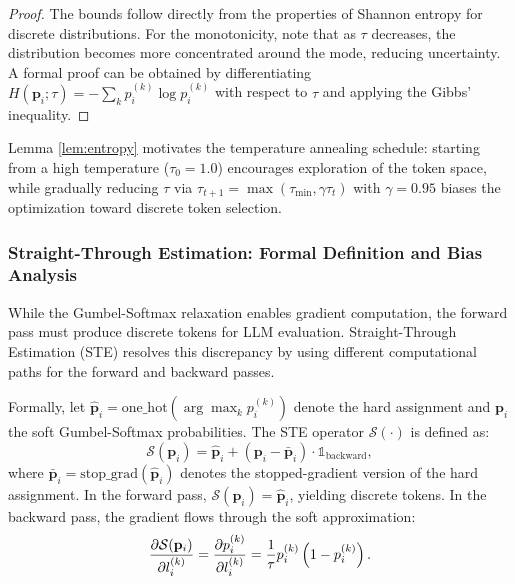 ﻿\documentclass[lettersize,journal]{IEEEtran}
\begin{document}
\begin{proof}
The bounds follow directly from the properties of Shannon entropy for discrete distributions. For the monotonicity, note that as $\tau$ decreases, the distribution becomes more concentrated around the mode, reducing uncertainty. A formal proof can be obtained by differentiating $H(\mathbf{p}_i; \tau) = -\sum_k p_i^{(k)} \log p_i^{(k)}$ with respect to $\tau$ and applying the Gibbs' inequality.
\end{proof}

Lemma \ref{lem:entropy} motivates the temperature annealing schedule: starting from a high temperature ($\tau_0 = 1.0$) encourages exploration of the token space, while gradually reducing $\tau$ via $\tau_{t+1} = \max(\tau_{\min}, \gamma \tau_t)$ with $\gamma = 0.95$ biases the optimization toward discrete token selection.

\subsubsection{Straight-Through Estimation: Formal Definition and Bias Analysis}
\label{sec:ste}

While the Gumbel-Softmax relaxation enables gradient computation, the forward pass must produce discrete tokens for LLM evaluation. Straight-Through Estimation (STE) \cite{bengio2013estimating} resolves this discrepancy by using different computational paths for the forward and backward passes.

Formally, let $\hat{\mathbf{p}}_i = \text{one\_hot}(\arg\max_k p_i^{(k)})$ denote the hard assignment and $\mathbf{p}_i$ the soft Gumbel-Softmax probabilities. The STE operator $\mathcal{S}(\cdot)$ is defined as:
\begin{equation}
\label{eq:ste}
\mathcal{S}(\mathbf{p}_i) = \hat{\mathbf{p}}_i + (\mathbf{p}_i - \bar{\mathbf{p}}_i) \cdot \mathbb{1}_{\text{backward}},
\end{equation}
where $\bar{\mathbf{p}}_i = \text{stop\_grad}(\hat{\mathbf{p}}_i)$ denotes the stopped-gradient version of the hard assignment. In the forward pass, $\mathcal{S}(\mathbf{p}_i) = \hat{\mathbf{p}}_i$, yielding discrete tokens. In the backward pass, the gradient flows through the soft approximation:
\begin{equation}
\label{eq:ste_gradient}
\frac{\partial \mathcal{S}(\mathbf{p}_i)}{\partial l_i^{(k)}} = \frac{\partial p_i^{(k)}}{\partial l_i^{(k)}} \\\\
= \frac{1}{\tau} p_i^{(k)} \left(1 - p_i^{(k)}\right).
\end{equation}
\end{document}
